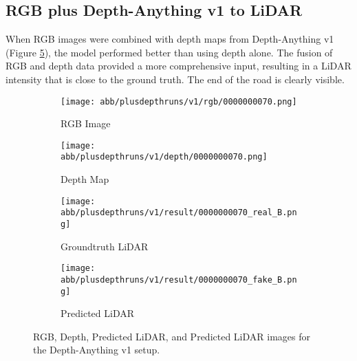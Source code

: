 \subsection{RGB plus Depth-Anything v1 to LiDAR}
When RGB images were combined with depth maps from Depth-Anything v1 (Figure \ref{v1_rgbd}), the model performed better than using depth alone. The fusion of RGB and depth data provided a more comprehensive input, resulting in a LiDAR intensity that is close to the ground truth. The end of the road is clearly visible.
\begin{figure}[!ht]
	\centering
	\begin{subfigure}{0.4\textwidth}
		\centering
		\texttt{[image: abb/plusdepthruns/v1/rgb/0000000070.png]}
		\caption{RGB Image}
		\label{fig:v1_rgb}
	\end{subfigure}
	
	\vspace{1em} %
	
	\begin{subfigure}{0.4\textwidth}
		\centering
		\texttt{[image: abb/plusdepthruns/v1/depth/0000000070.png]}
		\caption{Depth Map}
		\label{fig:v1_depth}
	\end{subfigure}
	
	\vspace{1em} %
	
	\begin{subfigure}{0.25\textwidth}
		\centering
		\texttt{[image: abb/plusdepthruns/v1/result/0000000070\_real\_B.png]}
		\caption{Groundtruth LiDAR}
		\label{fig:v1_pred_lidar}
	\end{subfigure}
	\begin{subfigure}{0.25\textwidth}
		\centering
		\texttt{[image: abb/plusdepthruns/v1/result/0000000070\_fake\_B.png]}
		\caption{Predicted LiDAR}
		\label{fig:v1_fake_lidar}
	\end{subfigure}
	
	\caption{RGB, Depth, Predicted LiDAR, and Predicted LiDAR images for the Depth-Anything v1 setup.}
	\label{v1_rgbd}
\end{figure}
\newpage
